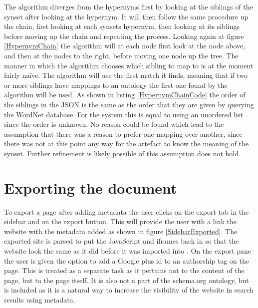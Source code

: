 The algorithm diverges from the hypernyms first by looking at the siblings of the synset after looking at the hypernym.
It will then follow the same procedure up the chain, first looking at each synsets hypernym,
then looking at its siblings before moving up the chain and repeating the process.
Looking again at figure \ref{HypernymChain} the algorithm will at each node first look at the node above,
and then at the nodes to the right, before moving one node up the tree.
The manner in which the algorithm chooses which sibling to map to is at the moment fairly naïve.
The algorithm will use the first match it finds,
meaning that if two or more siblings have mappings to an ontology the first one found by the algorithm will be used.
As shown in listing \ref{HypernymChainCode} the order of the siblings in the JSON is the same as the order that they
are given by querying the WordNet database.
For the system this is equal to using an unordered list since the order is unknown.
No reason could be found which lead to the assumption that there was a reason to prefer one mapping over another,
since there was not at this point any way for the artefact to know the meaning of the synset.
Further refinement is likely possible of this assumption does not hold.

\section{Exporting the document}
To export a page after adding metadata the user clicks on the export tab in the sidebar and on the export button.
This will provide the user with a link the website with the metadata added as shown in figure \ref{SidebarExported}.
The exported site is parsed to put the JavaScript and iframes back in so that the website look the same as it did
before it was imported into \theartefact.
On the export pane the user is given the option to add a Google plus id to an authorship tag on the page.
This is treated as a separate task as it pertains not to the content of the page, but to the page itself.
It is also not a part of the schema.org ontology, but is included as it is a natural way to increase the visibility of
the website in search results using metadata.

